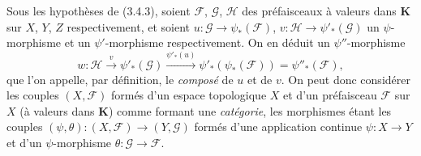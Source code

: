 \begin{env}[3.5.2]
\label{0.3.5.2-fr}
Sous les hypothèses de (3.4.3), soient $\mathcal{F}$, $\mathcal{G}$,
$\mathcal{H}$ des préfaisceaux à valeurs dans $\boldsymbol{K}$ sur $X$, $Y$, $Z$
respectivement, et soient
$u:\mathcal{G}\to\psi_*(\mathcal{F})$,
$v:\mathcal{H}\to\psi'_*(\mathcal{G})$ un $\psi$-morphisme et un
$\psi'$-morphisme respectivement. On en déduit un $\psi''$-morphisme
\[
  w:\mathcal{H}\xrightarrow{v}\psi'_*(\mathcal{G})
  \xrightarrow{\psi'_*(u)}
  \psi'_*(\psi_*(\mathcal{F}))=\psi''_*(\mathcal{F}),
\]
que l'on appelle, par définition, le \emph{composé} de $u$ et de $v$. On peut
donc considérer les couples $(X,\mathcal{F})$ formés d'un espace topologique
$X$ et d'un préfaisceau $\mathcal{F}$ sur $X$ (à valeurs dans $\boldsymbol{K}$)
comme formant une \emph{catégorie}, les morphismes étant les couples
$(\psi,\theta):(X,\mathcal{F})\to(Y,\mathcal{G})$ formés d'une application
continue $\psi:X\to Y$ et d'un $\psi$-morphisme
$\theta:\mathcal{G}\to\mathcal{F}$.
\end{env}

